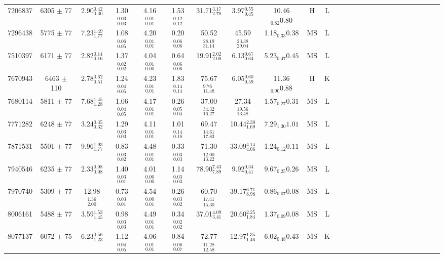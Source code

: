 \begin{table}
\begin{tabular}{cccccccccccccccccccccccccc}
7206837  & 6305 $\pm$ 77 & 2.90$_{0.30}^{0.42}$ & 1.30$_{0.03}^{0.03}$ & 4.16$_{0.01}^{0.01}$ & 1.53$_{0.12}^{0.12}$ & 31.71$_{2.78}^{3.17}$ & 3.97$_{0.45}^{0.55}$ & 10.46$_{0.82}{0.80}$ & H & L \\
7296438  & 5775 $\pm$ 77 & 7.23$_{1.77}^{1.49}$ & 1.08$_{0.05}^{0.06}$ & 4.20$_{0.01}^{0.01}$ & 0.20$_{0.06}^{0.06}$ & 50.52$_{31.14}^{28.19}$ & 45.59$_{29.04}^{23.38}$ & 1.18$_{0.33}{0.38}$ & MS & L \\
7510397  & 6171 $\pm$ 77 & 2.82$_{0.16}^{0.14}$ & 1.37$_{0.02}^{0.02}$ & 4.04$_{0.00}^{0.01}$ & 0.64$_{0.06}^{0.06}$ & 19.91$_{2.00}^{2.02}$ & 6.13$_{0.64}^{0.67}$ & 5.23$_{0.47}{0.45}$ & MS & L \\
7670943  & 6463 $\pm$ 110& 2.78$_{0.51}^{0.62}$ & 1.24$_{0.05}^{0.04}$ & 4.23$_{0.01}^{0.01}$ & 1.83$_{0.14}^{0.14}$ & 75.67$_{11.48}^{9.76}$ & 6.05$_{0.59}^{0.60}$ & 11.36$_{0.90}{0.88}$ & H & K \\
7680114  & 5811 $\pm$ 77 & 7.68$_{1.28}^{1.45}$ & 1.06$_{0.05}^{0.04}$ & 4.17$_{0.01}^{0.01}$ & 0.26$_{0.04}^{0.05}$ & 37.00$_{16.27}^{34.32}$ & 27.34$_{13.48}^{19.56}$ & 1.57$_{0.27}{0.31}$ & MS & L \\
7771282  & 6248 $\pm$ 77 & 3.24$_{0.32}^{0.35}$ & 1.29$_{0.03}^{0.03}$ & 4.11$_{0.01}^{0.01}$ & 1.01$_{0.18}^{0.14}$ & 69.47$_{17.83}^{14.61}$ & 10.44$_{1.69}^{2.30}$ & 7.29$_{1.30}{1.01}$ & MS & L \\
7871531  & 5501 $\pm$ 77 & 9.96$_{1.77}^{1.93}$ & 0.83$_{0.02}^{0.03}$ & 4.48$_{0.01}^{0.01}$ & 0.33$_{0.03}^{0.03}$ & 71.30$_{13.22}^{12.00}$ & 33.09$_{4.06}^{4.14}$ & 1.24$_{0.12}{0.11}$ & MS & L \\
7940546  & 6235 $\pm$ 77 & 2.33$_{0.08}^{0.08}$ & 1.40$_{0.01}^{0.03}$ & 4.01$_{0.00}^{0.00}$ & 1.14$_{0.03}^{0.03}$ & 78.90$_{7.89}^{7.43}$ & 9.92$_{0.41}^{0.34}$ & 9.67$_{0.25}{0.26}$ & MS & L \\
7970740  & 5309 $\pm$ 77 & 12.98$_{2.00}^{1.36}$ & 0.73$_{0.01}^{0.03}$ & 4.54$_{0.01}^{0.00}$ & 0.26$_{0.02}^{0.03}$ & 60.70$_{15.30}^{17.41}$ & 39.17$_{8.98}^{6.71}$ & 0.86$_{0.07}{0.08}$ & MS & L \\
8006161  & 5488 $\pm$ 77 & 3.59$_{1.45}^{1.53}$ & 0.98$_{0.03}^{0.03}$ & 4.49$_{0.01}^{0.01}$ & 0.34$_{0.02}^{0.02}$ & 37.01$_{3.41}^{4.09}$ & 20.60$_{1.84}^{2.25}$ & 1.37$_{0.09}{0.08}$ & MS & L \\
8077137  & 6072 $\pm$ 75 & 6.23$_{1.23}^{0.56}$ & 1.12$_{0.05}^{0.04}$ & 4.06$_{0.01}^{0.01}$ & 0.84$_{0.07}^{0.06}$ & 72.77$_{12.58}^{11.28}$ & 12.97$_{1.46}^{1.35}$ & 6.02$_{0.48}{0.43}$ & MS & K \\

\end{tabular}
\end{table}

